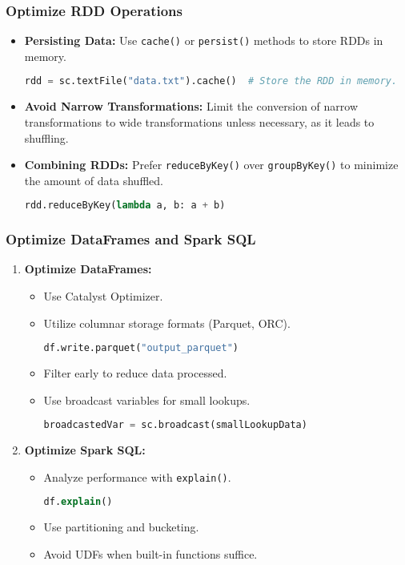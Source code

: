 \documentclass{beamer}
\begin{document}
\begin{frame}[fragile]
    \frametitle{Optimize RDD Operations}
    \begin{itemize}
        \item \textbf{Persisting Data:} Use \texttt{cache()} or \texttt{persist()} methods to store RDDs in memory.
        \begin{lstlisting}[language=Python]
rdd = sc.textFile("data.txt").cache()  # Store the RDD in memory.
        \end{lstlisting}
        
        \item \textbf{Avoid Narrow Transformations:} Limit the conversion of narrow transformations to wide transformations unless necessary, as it leads to shuffling.
        
        \item \textbf{Combining RDDs:} Prefer \texttt{reduceByKey()} over \texttt{groupByKey()} to minimize the amount of data shuffled.
        \begin{lstlisting}[language=Python]
rdd.reduceByKey(lambda a, b: a + b)
        \end{lstlisting}
    \end{itemize}
\end{frame}

\begin{frame}[fragile]
    \frametitle{Optimize DataFrames and Spark SQL}
    \begin{enumerate}
        \item \textbf{Optimize DataFrames:}
        \begin{itemize}
            \item Use Catalyst Optimizer.
            \item Utilize columnar storage formats (Parquet, ORC).
            \begin{lstlisting}[language=Python]
df.write.parquet("output_parquet")
            \end{lstlisting}
            \item Filter early to reduce data processed.
            \item Use broadcast variables for small lookups.
            \begin{lstlisting}[language=Python]
broadcastedVar = sc.broadcast(smallLookupData)
            \end{lstlisting}
        \end{itemize}
        
        \item \textbf{Optimize Spark SQL:}
        \begin{itemize}
            \item Analyze performance with \texttt{explain()}.
            \begin{lstlisting}[language=SQL]
df.explain()
            \end{lstlisting}
            \item Use partitioning and bucketing.
            \item Avoid UDFs when built-in functions suffice.
        \end{itemize}
    \end{enumerate}
\end{frame}
\end{document}
